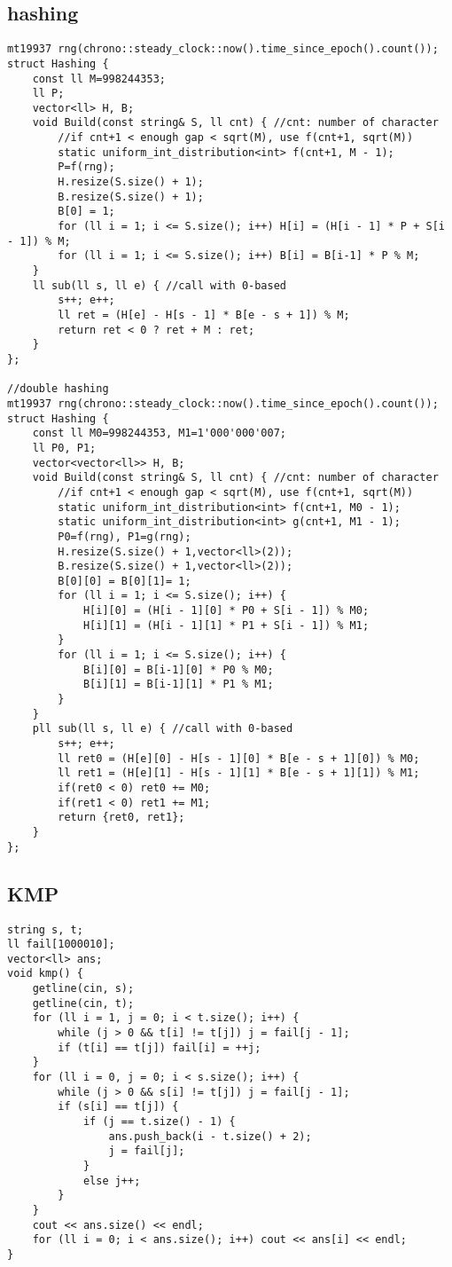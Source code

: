 \documentclass[landscape, 8pt, a4paper, oneside, twocolumn]{extarticle}
\begin{document}
\subsection{hashing}
\begin{verbatim}
mt19937 rng(chrono::steady_clock::now().time_since_epoch().count());
struct Hashing {
	const ll M=998244353;
	ll P;
    vector<ll> H, B;
    void Build(const string& S, ll cnt) { //cnt: number of character
		//if cnt+1 < enough gap < sqrt(M), use f(cnt+1, sqrt(M))
		static uniform_int_distribution<int> f(cnt+1, M - 1);
		P=f(rng);
        H.resize(S.size() + 1);
        B.resize(S.size() + 1);
        B[0] = 1;
        for (ll i = 1; i <= S.size(); i++) H[i] = (H[i - 1] * P + S[i - 1]) % M;
        for (ll i = 1; i <= S.size(); i++) B[i] = B[i-1] * P % M;
    }
    ll sub(ll s, ll e) { //call with 0-based
        s++; e++;
		ll ret = (H[e] - H[s - 1] * B[e - s + 1]) % M;
		return ret < 0 ? ret + M : ret;
    }
};

//double hashing
mt19937 rng(chrono::steady_clock::now().time_since_epoch().count());
struct Hashing {
	const ll M0=998244353, M1=1'000'000'007;
	ll P0, P1;
    vector<vector<ll>> H, B;
    void Build(const string& S, ll cnt) { //cnt: number of character
		//if cnt+1 < enough gap < sqrt(M), use f(cnt+1, sqrt(M))
		static uniform_int_distribution<int> f(cnt+1, M0 - 1);
		static uniform_int_distribution<int> g(cnt+1, M1 - 1);
		P0=f(rng), P1=g(rng);
        H.resize(S.size() + 1,vector<ll>(2));
        B.resize(S.size() + 1,vector<ll>(2));
        B[0][0] = B[0][1]= 1;
        for (ll i = 1; i <= S.size(); i++) {
			H[i][0] = (H[i - 1][0] * P0 + S[i - 1]) % M0;
			H[i][1] = (H[i - 1][1] * P1 + S[i - 1]) % M1;
		}
        for (ll i = 1; i <= S.size(); i++) {
			B[i][0] = B[i-1][0] * P0 % M0;
			B[i][1] = B[i-1][1] * P1 % M1;
		}
    }
    pll sub(ll s, ll e) { //call with 0-based
        s++; e++;
		ll ret0 = (H[e][0] - H[s - 1][0] * B[e - s + 1][0]) % M0;
		ll ret1 = (H[e][1] - H[s - 1][1] * B[e - s + 1][1]) % M1;
		if(ret0 < 0) ret0 += M0;
		if(ret1 < 0) ret1 += M1;
        return {ret0, ret1};
    }
};
\end{verbatim}
\newpage
\subsection{KMP}
\begin{verbatim}
string s, t;
ll fail[1000010];
vector<ll> ans;
void kmp() {
	getline(cin, s);
	getline(cin, t);
	for (ll i = 1, j = 0; i < t.size(); i++) {
		while (j > 0 && t[i] != t[j]) j = fail[j - 1];
		if (t[i] == t[j]) fail[i] = ++j;
	}
	for (ll i = 0, j = 0; i < s.size(); i++) {
		while (j > 0 && s[i] != t[j]) j = fail[j - 1];
		if (s[i] == t[j]) {
			if (j == t.size() - 1) {
				ans.push_back(i - t.size() + 2);
				j = fail[j];
			}
			else j++;
		}
	}
	cout << ans.size() << endl;
	for (ll i = 0; i < ans.size(); i++) cout << ans[i] << endl;
}
\end{verbatim}
\vspace{5mm}
\end{document}
